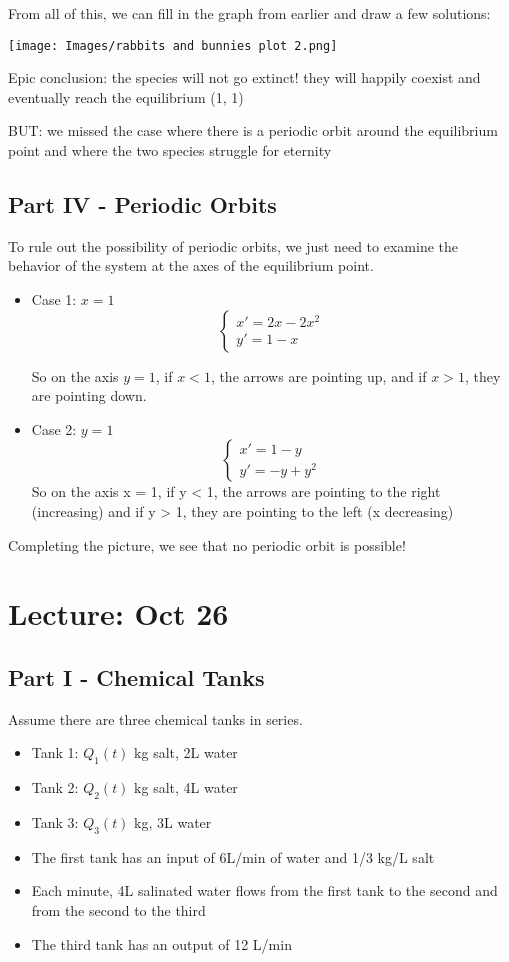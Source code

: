 \documentclass[12pt]{article}
\begin{document}
From all of this, we can fill in the graph from earlier and draw a few solutions:

\texttt{[image: Images/rabbits and bunnies plot 2.png]}

Epic conclusion: the species will not go extinct! they will happily coexist and eventually reach the equilibrium (1, 1)

BUT: we missed the case where there is a periodic orbit around the equilibrium point and where the two species struggle for eternity

\subsection*{Part IV - Periodic Orbits}
To rule out the possibility of periodic orbits, we just need to examine the behavior of the system at the axes of the equilibrium point.

\begin{itemize}
    \item Case 1: $x = 1$
    \[\begin{cases}
        x' = 2x - 2x^2\\
        y' = 1 - x
    \end{cases}\]

    So on the axis $y = 1$, if $x < 1$, the arrows are pointing up, and if $x > 1$, they are pointing down.

    \item Case 2: $y = 1$
    \[\begin{cases}
        x' = 1 -y\\
        y' = -y + y^2
    \end{cases}\]
    So on the axis x = 1, if y < 1, the arrows are pointing to the right (increasing) and if y > 1, they are pointing to the left (x decreasing)
\end{itemize}

Completing the picture, we see that no periodic orbit is possible!

\section{Lecture: Oct 26}
\subsection*{Part I - Chemical Tanks}
Assume there are three chemical tanks in series.
\begin{itemize}
    \item Tank 1: $Q_1(t)$ kg salt, 2L water
    \item Tank 2: $Q_2(t)$ kg salt, 4L water
    \item Tank 3: $Q_3(t)$ kg, 3L water
    \item The first tank has an input of 6L/min of water and 1/3 kg/L salt 
    \item Each minute, 4L salinated water flows from the first tank to the second and from the second to the third
    \item The third tank has an output of 12 L/min
\end{itemize}
\end{document}
